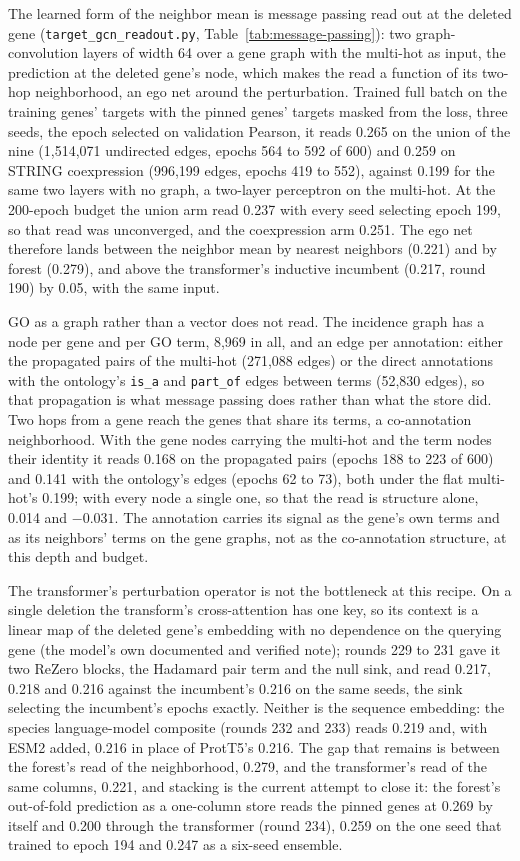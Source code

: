 The learned form of the neighbor mean is message passing read out at the deleted gene
(\texttt{target\_gcn\_readout.py}, Table~\ref{tab:message-passing}): two
graph-convolution layers of width 64 over a gene graph with the multi-hot as input,
the prediction at the deleted gene's node, which makes the read a function of its
two-hop neighborhood, an ego net around the perturbation. Trained full batch on the
training genes' targets with the pinned genes' targets masked from the loss, three
seeds, the epoch selected on validation Pearson, it reads 0.265 on the union of the
nine (1,514,071 undirected edges, epochs 564 to 592 of 600) and 0.259 on STRING
coexpression (996,199 edges, epochs 419 to 552), against 0.199 for the same two layers
with no graph, a two-layer perceptron on the multi-hot. At the 200-epoch budget the
union arm read 0.237 with every seed selecting epoch 199, so that read was
unconverged, and the coexpression arm 0.251. The ego net therefore lands between the
neighbor mean by nearest neighbors (0.221) and by forest (0.279), and above the
transformer's inductive incumbent (0.217, round 190) by 0.05, with the same input.

GO as a graph rather than a vector does not read. The incidence graph has a node per
gene and per GO term, 8,969 in all, and an edge per annotation: either the propagated
pairs of the multi-hot (271,088 edges) or the direct annotations with the ontology's
\texttt{is\_a} and \texttt{part\_of} edges between terms (52,830 edges), so that
propagation is what message passing does rather than what the store did. Two hops from
a gene reach the genes that share its terms, a co-annotation neighborhood. With the
gene nodes carrying the multi-hot and the term nodes their identity it reads 0.168 on
the propagated pairs (epochs 188 to 223 of 600) and 0.141 with the ontology's edges
(epochs 62 to 73), both under the flat multi-hot's 0.199; with every node a single one,
so that the read is structure alone, 0.014 and $-0.031$. The annotation carries its
signal as the gene's own terms and as its neighbors' terms on the gene graphs, not as
the co-annotation structure, at this depth and budget.

The transformer's perturbation operator is not the bottleneck at this recipe. On a
single deletion the transform's cross-attention has one key, so its context is a
linear map of the deleted gene's embedding with no dependence on the querying gene (the
model's own documented and verified note); rounds 229 to 231 gave it two ReZero blocks,
the Hadamard pair term and the null sink, and read 0.217, 0.218 and 0.216 against the
incumbent's 0.216 on the same seeds, the sink selecting the incumbent's epochs exactly.
Neither is the sequence embedding: the species language-model composite (rounds 232 and
233) reads 0.219 and, with ESM2 added, 0.216 in place of ProtT5's 0.216. The gap that
remains is between the forest's read of the neighborhood, 0.279, and the transformer's
read of the same columns, 0.221, and stacking is the current attempt to close it: the
forest's out-of-fold prediction as a one-column store reads the pinned genes at 0.269
by itself and 0.200 through the transformer (round 234), 0.259 on the one seed that
trained to epoch 194 and 0.247 as a six-seed ensemble.




